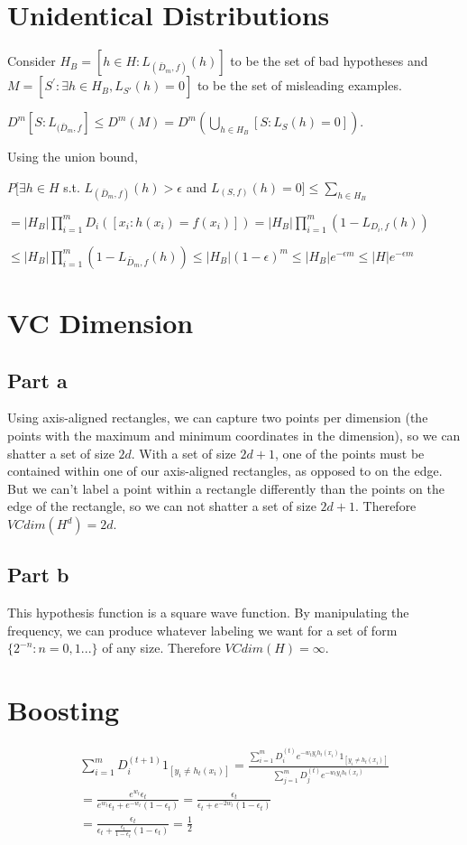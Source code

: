 \documentclass{article}
\begin{document}
\section{Unidentical Distributions}

Consider \(H_B = [ h \in H:  L_{(\bar{D}_m,f)}(h) ]\) to be the set of bad hypotheses and 
\(M = [ S^{'} : \exists h \in H_B, L_{S'}(h)=0 ] \) to be the set of misleading examples.

\( D^m[S: L_{(\bar{D}_m,f}] \le D^m(M) = D^m ( \bigcup\limits_{h \in H_B} [S: L_S(h) =0 ]) \). 

Using the union bound, 

\(P[\exists h \in H  \) s.t. \( L_{(\bar{D}_m,f)}(h) > \epsilon \) and  \( L_{(S,f)}(h) = 0 ] \le \sum_{h \in H_B} \)

\( = |H_B| \prod_{i=1}^{m} D_i([x_i : h(x_i) = f(x_i)])  = |H_B| \prod_{i=1}^{m} (1- L_{D_i,f}(h)) \)

\(  \le |H_B| \prod_{i=1}^{m} (1- L_{\bar{D}_m,f}(h)) \le |H_B| (1-\epsilon)^m  \le |H_B| e^{-\epsilon m} \le |H| e^{-\epsilon m} \)


\section{VC Dimension}
\subsection{Part a}
Using axis-aligned rectangles, we can capture two points per dimension (the points with the maximum and minimum coordinates in the dimension), so we can shatter a set of size \( 2d \). With a set of size \( 2d+1 \), one of the points must be contained
within one of our axis-aligned rectangles, as opposed to on the edge. But we can't label a point within a rectangle differently than the points on the edge of the rectangle, so we can not shatter a set of size \( 2d+1 \). Therefore \(VCdim(H^d) = 2d \).
\subsection{Part b}
This hypothesis function is a square wave function. By manipulating the frequency, we can produce whatever labeling we want for a set of form \( \{2^{-n} : n = 0, 1...\}\) of any size. Therefore \(VCdim(H) = \infty \).

\section{Boosting}
\begin{equation}
\begin{split}
\sum_{i=1}^{m} D_i^{(t+1)} 1_{[y_i \ne h_t(x_i)]} 
= \frac{ \sum_{i=1}^{m} D_i^{(t)} e^{-w_t y_i h_t(x_i)} 1_{[y_i \ne h_t(x_i)]} }{ \sum_{j=1}^{m}D_j^{(t)}e^{-w_t y_i h_t(x_i)}}\\
= \frac {e^{w_t } \epsilon_t}{e^{w_t } \epsilon_t + e^{-w_t } (1-\epsilon_t)} = \frac {\epsilon_t}{\epsilon_t + e^{-2w_t } (1-\epsilon_t)}\\
=  \frac {\epsilon_t}{\epsilon_t + \frac {\epsilon_t }{1-\epsilon_t} (1-\epsilon_t)} = \frac {1}{2}
\end{split}
\end{equation}
\end{document}
